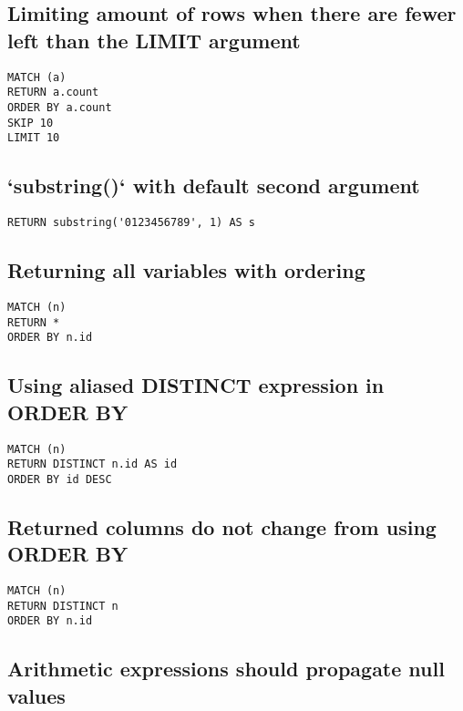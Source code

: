 \subsection{Limiting amount of rows when there are fewer left than the LIMIT argument}

\begin{lstlisting}
MATCH (a)
RETURN a.count
ORDER BY a.count
SKIP 10
LIMIT 10
\end{lstlisting}

\subsection{`substring()` with default second argument}

\begin{lstlisting}
RETURN substring('0123456789', 1) AS s
\end{lstlisting}

\subsection{Returning all variables with ordering}

\begin{lstlisting}
MATCH (n)
RETURN *
ORDER BY n.id
\end{lstlisting}

\subsection{Using aliased DISTINCT expression in ORDER BY}

\begin{lstlisting}
MATCH (n)
RETURN DISTINCT n.id AS id
ORDER BY id DESC
\end{lstlisting}

\subsection{Returned columns do not change from using ORDER BY}

\begin{lstlisting}
MATCH (n)
RETURN DISTINCT n
ORDER BY n.id
\end{lstlisting}

\subsection{Arithmetic expressions should propagate null values}

